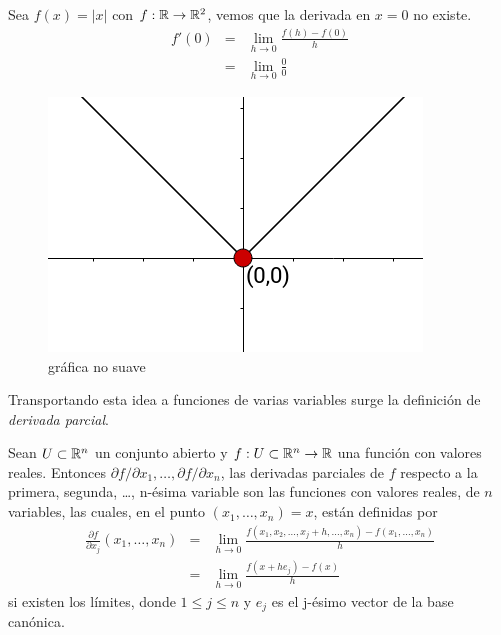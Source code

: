 \begin{myExample}
    Sea $f(x) = |x|$ con $f:\mathbb{R} \rightarrow \mathbb{R}^{2}$, vemos que la derivada en $x=0$ no existe.
    \begin{eqnarray*}
        f'(0) &=& \lim_{h \rightarrow 0} \frac{f(h) - f(0)}{h} \\
              &=& \lim_{h \rightarrow 0} \frac{0}{0}
    \end{eqnarray*}
\end{myExample}

\begin{figure}[!ht]
  \begin{center}
      \includegraphics[width=0.6\linewidth]{gfx/grafica-abs}
      \caption{gráfica no suave}
      \label{fig:boat1}
  \end{center}
\end{figure}

Transportando esta idea a funciones de varias variables surge la definición de \emph{derivada parcial}.

\begin{definition}
    Sean $U \subset \mathbb{R}^{n}$ un conjunto abierto y $f:U \subset \mathbb{R}^{n} \rightarrow \mathbb{R}$ una función con valores reales. Entonces $\partial f/\partial x_{1},
    \ldots, \partial f/ \partial x_{n}$, las derivadas parciales de $f$ respecto a la primera, segunda, \dots, n-ésima variable son las funciones con valores
    reales, de $n$ variables, las cuales, en el punto $(x_{1},\ldots,x_{n}) = x$, están definidas por
    \begin{eqnarray*}
        \frac{\partial f}{\partial x_{j}} (x_{1},\ldots,x_{n}) &=& \lim_{h \rightarrow 0} \frac{f(x_{1},x_{2},\ldots,x_{j} + h,\ldots,x_{n}) - f(x_{1},\ldots,x_{n})}{h} \\
                                                               &=& \lim_{h \rightarrow 0} \frac{f(x+he_{j})-f(x)}{h} 
    \end{eqnarray*}
    si existen los límites, donde $1 \le j \le n$ y $e_{j}$ es el j-ésimo vector de la base canónica.
\end{definition}

